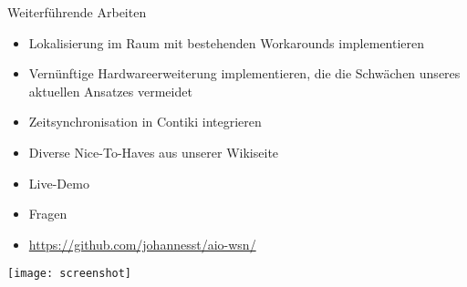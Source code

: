\documentclass[fleqn,11pt]{beamer}
\begin{document}
      \begin{frame}{Weiterführende Arbeiten}
	\begin{itemize}
      \item Lokalisierung im Raum mit bestehenden Workarounds
	implementieren
      \item Vernünftige Hardwareerweiterung implementieren, die die
	Schwächen unseres aktuellen Ansatzes vermeidet
      \item Zeitsynchronisation in Contiki integrieren
      \item Diverse Nice-To-Haves aus unserer Wikiseite
    \end{itemize}
      \end{frame}
      \begin{frame}
	\begin{itemize} \Large
	  \item Live-Demo
	  \item Fragen
	  \item \url{https://github.com/johannesst/aio-wsn/}
	\end{itemize}
      \end{frame}
      \begin{frame}
	\begin{center}
	\texttt{[image: screenshot]}
      \end{center}
      \end{frame}
\end{document}
